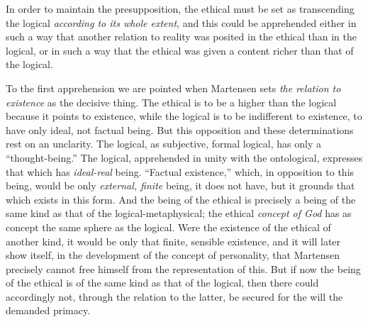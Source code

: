 \documentclass[12pt,a4paper]{book}
\begin{document}
In order to maintain the presupposition, the ethical must be set as transcending the
logical \emph{according to its whole extent}, and this could be apprehended either
in such a way that another relation to reality was posited in the ethical than in
the logical, or in such a way that the ethical was given a content richer than that
of the logical.

To the first apprehension we are pointed when Martensen sets \emph{the relation to
existence} as the decisive thing. The ethical is to be a higher than the logical
because it points to existence, while the logical is to be indifferent to existence,
to have only ideal, not factual being. But this opposition and these determinations
rest on an unclarity. The logical, as subjective, formal logical, has only a
``thought-being.'' The logical, apprehended in unity with the ontological, expresses
that which has \emph{ideal-real} being. ``Factual existence,'' which, in opposition to this
being, would be only \emph{external, finite} being, it does not have, but it grounds that
which exists in this form. And the being of the ethical is precisely a being of the
same kind as that of the logical-metaphysical; the ethical \emph{concept of God} has as
concept the same sphere as the logical. Were the existence of the ethical of another
kind, it would be only that finite, sensible existence, and it will later show
itself, in the development of the concept of personality, that Martensen precisely
cannot free himself from the representation of this. But if now the being of the
ethical is of the same kind as that of the logical, then there could accordingly
not, through the relation to the latter, be secured for the will the demanded
primacy.
\end{document}
